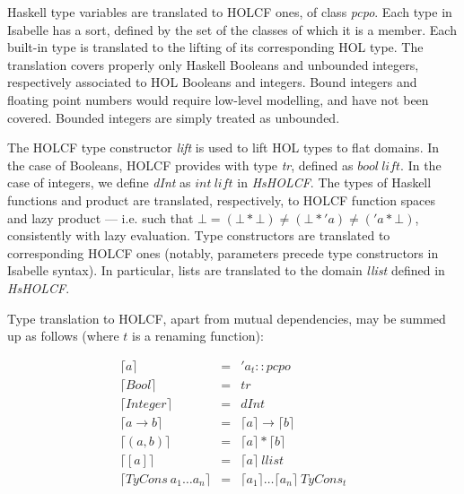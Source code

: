 \documentclass{llncs}
\begin{document}

Haskell type variables are translated to HOLCF ones, of class \emph{pcpo}.
Each type in Isabelle has a sort, defined by the set of the classes of which
it is a member. Each built-in type is translated to the lifting of its
corresponding HOL type. The translation covers properly only Haskell Booleans
and unbounded integers, respectively associated to HOL Booleans and integers.
Bound integers and floating point numbers would require low-level modelling,
and have not been covered. Bounded integers are simply treated as unbounded.

The HOLCF type constructor \emph{lift} is used to lift HOL types to flat
domains.  In the case of Booleans, HOLCF provides with type \emph{tr}, defined
as $bool \ lift$. In the case of integers, we define \emph{dInt} as $int \ 
lift$ in \emph{HsHOLCF}.  The types of Haskell functions and product are
translated, respectively, to HOLCF function spaces and lazy product --- i.e.
such that $\bot = (\bot * \bot) \neq (\bot*'a) \neq ('a * \bot)$, consistently
with lazy evaluation.  Type constructors are translated to corresponding HOLCF
ones (notably, parameters precede type constructors in Isabelle syntax). In
particular, lists are translated to the domain \emph{llist} defined in
\emph{HsHOLCF}.


Type translation to HOLCF, apart from mutual dependencies, may be summed up as
follows (where $t$ is a renaming function):


$$\begin{array}{lcl}
  \lceil a \rceil & = & 'a_{t}::pcpo \\
  \lceil Bool \rceil & = & tr \\
  \lceil Integer \rceil & = & dInt \\
  \lceil a \to b \rceil & = & \lceil a \rceil \to \lceil b \rceil \\
  \lceil (a,b) \rceil & = & \lceil a \rceil * \lceil b \rceil \\
  \lceil [a] \rceil & = & \lceil a \rceil \ llist \\
  \lceil TyCons \ a_{1} \ldots a_{n} \rceil & = & \lceil a_{1} \rceil \ldots \lceil a_{n} \rceil \ TyCons_{t} 
\end{array}$$
\end{document}
